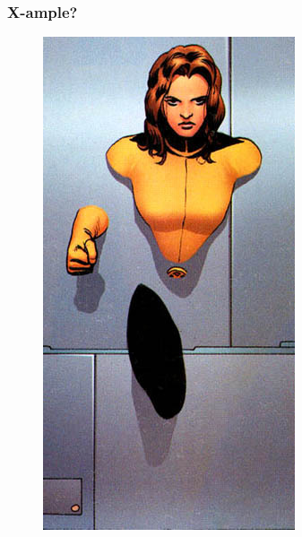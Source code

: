 \documentclass[11pt]{beamer}
\begin{document}
\begin{frame}
\begin{columns}
\begin{column}{0.5\textwidth}
\begin{figure}
					\end{figure}

			\end{column}
		
		\end{columns}
	\end{frame}
	
	\begin{frame}
		\frametitle{X-ample?}
		
		\pause
		\begin{figure}
			\centering
			\includegraphics[width=0.36\linewidth]{walkthroughwalls_shadowcat2}
			
		\end{figure}
		
	\end{frame}
	
	
\end{document}
